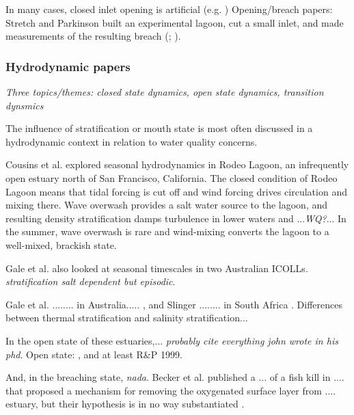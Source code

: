 In many cases, closed inlet opening is artificial (e.g. \cite{fortunato_morphological_2014, behrens_episodic_2013})
Opening/breach papers: \parencite{rich_hydrologic_2013, parkinson_breaching_2007, stretch_breaching_2006, elwany_opening_1998, fortunato_morphological_2014}
Stretch and Parkinson built an experimental lagoon, cut a small inlet, and made measurements of the resulting breach (\cite*{stretch_breaching_2006}; \cite{parkinson_breaching_2007}).



\subsubsection{Hydrodynamic papers}
\emph{Three topics/themes: closed state dynamics, open state dynamics, transition dynsmics}


The influence of stratification or mouth state is most often discussed in a hydrodynamic context in relation to water quality concerns.

Cousins et al. \parencite*{cousins_effects_2010} explored seasonal hydrodynamics in Rodeo Lagoon, an infrequently open estuary north of San Francisco, California. The closed condition of Rodeo Lagoon means that tidal forcing is cut off and wind forcing drives circulation and mixing there. Wave overwash provides a salt water source to the lagoon, and resulting density stratification damps turbulence in lower waters and ...\emph{WQ?}... In the summer, wave overwash is rare and wind-mixing converts the lagoon to a well-mixed, brackish state.

Gale et al. \parencite*{gale_vertical_2006} also looked at seasonal timescales in two Australian ICOLLs. \emph{stratification salt dependent but episodic}. 




 Gale et al. ........ in Australia..... \parencite*{gale_vertical_2006}, and Slinger ........ in South Africa \parencite*{slinger_evolution_1990}. Differences between thermal stratification and salinity stratification... 

In the open state of these estuaries,... \emph{probably cite everything john wrote in his phd}. Open state: \parencite{largier_dynamics_1991}, and at least R\&P 1999. 


And, in the breaching state, \emph{nada}. Becker et al. published a ... of a fish kill in .... that proposed a mechanism for removing the oxygenated surface layer from .... estuary, but their hypothesis is in no way substantiated \parencite*{becker_artificial_2009}.




